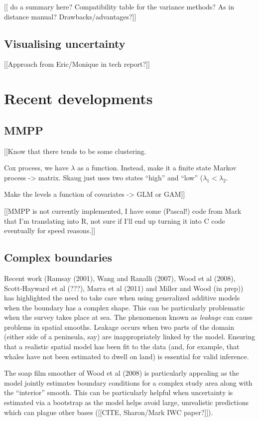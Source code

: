 \documentclass[useAMS,referee]{biom}
\begin{document}
[[ do a summary here? Compatibility table for the variance methods? As in distance manual? Drawbacks/advantages?]]

\subsection{Visualising uncertainty}

[[Approach from Eric/Monique in tech report?]]


\section{Recent developments}
\label{s:recentadvances}


\subsection{MMPP}

[[Know that there tends to be some clustering.

Cox process, we have $\lambda$ as a function. 
Instead, make it a finite state Markov process -> matrix.
Skaug just uses two states ``high'' and ``low'' ($\lambda_1< \lambda_2$.

Make the levels a function of covariates -> GLM or GAM]]

[[MMPP is not currently implemented, I have some (Pascal!) code from Mark that I'm translating into R, not sure if I'll end up turning it into C code eventually for speed reasons.]]


\subsection{Complex boundaries}
\label{s:leakage}

Recent work (Ramsay (2001), Wang and Ranalli (2007), Wood et al (2008), Scott-Hayward et al (???), Marra et al (2011) and Miller and Wood (in prep)) has highlighted the need to take care when using generalized additive models when the boundary has a complex shape. This can be particularly problematic when the survey takes place at sea. The phenomenon known as \textit{leakage} can cause problems in spatial smooths. Leakage occurs when two parts of the domain (either side of a peninsula, say) are inappropriately linked by the model. Ensuring that a realistic spatial model has been fit to the data (and, for example, that whales have not been estimated to dwell on land) is essential for valid inference.

The soap film smoother of Wood et al (2008) is particularly appealing as the model jointly estimates boundary conditions for a complex study area along with the ``interior'' smooth. This can be particularly helpful when uncertainty is estimated via a bootstrap as the model helps avoid large, unrealistic predictions which can plague other bases ([[CITE, Sharon/Mark IWC paper?]]).
\end{document}
